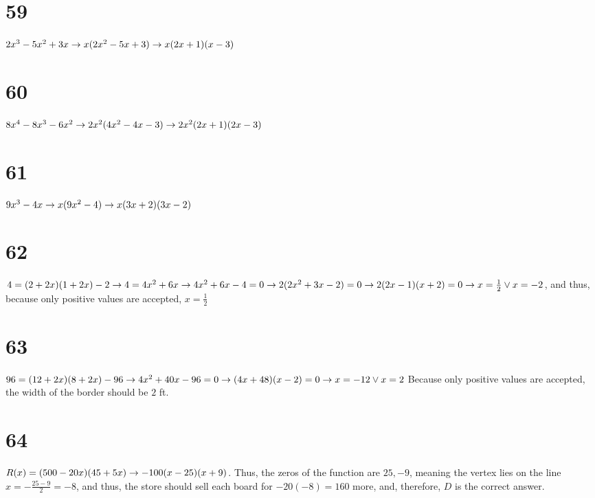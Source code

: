 \documentclass{article}
\theoremstyle{definition}
\begin{document}
\section*{59}
$2x^3-5x^2+3x\newline\rightarrow x(2x^2-5x+3)\newline\rightarrow x(2x+1)(x-3)$

\section*{60}
$8x^4-8x^3-6x^2\newline\rightarrow 2x^2(4x^2-4x-3)\newline\rightarrow 2x^2(2x+1)(2x-3)$

\section*{61}
$9x^3-4x\newline\rightarrow x(9x^2-4)\newline\rightarrow x(3x+2)(3x-2)$

\section*{62}
$4=(2+2x)(1+2x)-2\newline\rightarrow 4=4x^2+6x\newline\rightarrow 4x^2+6x-4=0\newline\rightarrow 2(2x^2+3x-2)=0\newline\rightarrow 2(2x-1)(x+2)=0\newline
\rightarrow x=\frac{1}{2}\vee x=-2$, and thus, because only positive values are accepted, $x=\frac{1}{2}$

\section*{63}
$96=(12+2x)(8+2x)-96\newline\rightarrow 4x^2+40x-96=0\newline\rightarrow (4x+48)(x-2)=0\newline\rightarrow x=-12\vee x=2$ Because only positive values 
are accepted, the width of the border should be $2$ ft. 

\section*{64}
$R(x)=(500-20x)(45+5x)\newline\rightarrow -100(x-25)(x+9)$. Thus, the zeros of the function are $25, -9$, meaning the vertex lies on the line $x=-\frac
{25-9}{2}=-8$, and thus, the store should sell each board for $-20(-8)=160$ more, and, therefore, $D$ is the correct answer.
\end{document}
